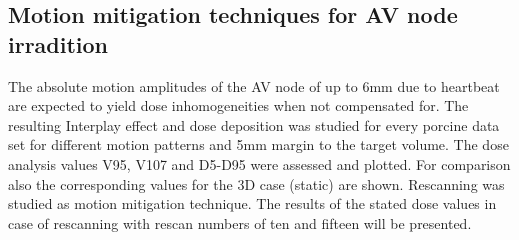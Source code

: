 \documentclass[type=dr, dr=rernat, accentcolor=tud7b,colorbacktitle, bigchapter, openright, twoside, 12pt ]{tudthesis}
\begin{document}
\newpage


\subsection{Motion mitigation techniques for AV node irradition}

The absolute motion amplitudes of the AV node of up to 6mm due to heartbeat are expected to yield dose inhomogeneities when not compensated 
for. The resulting Interplay effect and dose deposition was studied for every porcine data set for different motion patterns and 5mm margin 
to the target volume. The dose analysis values V95, V107 and D5-D95 were assessed and plotted. For comparison also the corresponding 
values for the 3D case (static) are shown. Rescanning was studied as motion mitigation technique.  
The results of the stated dose values in case of rescanning with rescan numbers of ten and fifteen will be presented. 
\end{document}
